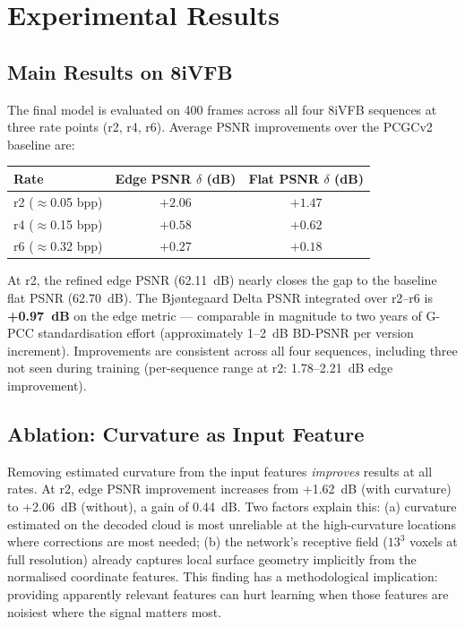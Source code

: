 \section*{Experimental Results}

\subsection*{Main Results on 8iVFB}

The final model is evaluated on 400 frames across all four 8iVFB sequences
at three rate points (r2, r4, r6).
Average PSNR improvements over the PCGCv2 baseline are:

\begin{center}
\begin{tabular}{lcc}
  \toprule
  Rate & Edge PSNR $\delta$ (dB) & Flat PSNR $\delta$ (dB) \\
  \midrule
  r2 ($\approx$0.05 bpp) & $\mathbf{+2.06}$ & $+1.47$ \\
  r4 ($\approx$0.15 bpp) & $+0.58$ & $+0.62$ \\
  r6 ($\approx$0.32 bpp) & $+0.27$ & $+0.18$ \\
  \bottomrule
\end{tabular}
\end{center}

At r2, the refined edge PSNR (62.11~dB) nearly closes the gap to the baseline
flat PSNR (62.70~dB).
The Bj{\o}ntegaard Delta PSNR integrated over r2--r6 is \textbf{+0.97~dB}
on the edge metric --- comparable in magnitude to two years of G-PCC
standardisation effort (approximately 1--2~dB BD-PSNR per version increment).
Improvements are consistent across all four sequences, including three not
seen during training (per-sequence range at r2: 1.78--2.21~dB edge improvement).

\subsection*{Ablation: Curvature as Input Feature}

Removing estimated curvature from the input features \emph{improves} results
at all rates.
At r2, edge PSNR improvement increases from +1.62~dB (with curvature) to
+2.06~dB (without), a gain of 0.44~dB.
Two factors explain this: (a) curvature estimated on the decoded cloud is
most unreliable at the high-curvature locations where corrections are most
needed; (b) the network's receptive field ($13^3$ voxels at full resolution)
already captures local surface geometry implicitly from the normalised
coordinate features.
This finding has a methodological implication: providing apparently relevant
features can hurt learning when those features are noisiest where the signal
matters most.

